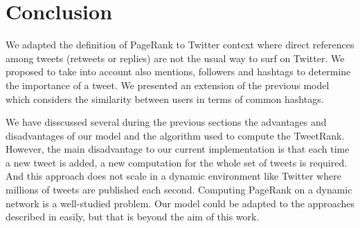 \section{Conclusion}
We adapted the definition of PageRank to Twitter context where direct references among tweets (retweets or replies) are not the usual way to surf on Twitter. We proposed to take into account also mentions, followers and hashtags to determine the importance of a tweet. We presented an extension of the previous model which considers the similarity between users in terms of common hashtags. 

We have disscussed several during the previous sections the advantages and disadvantages of our model and the algorithm used to compute the TweetRank. However, the main disadvantage to our current implementation is that each time a new tweet is added, a new computation for the whole set of tweets is required. And this approach does not scale in a dynamic environment like Twitter where millions of tweets are published each second. Computing PageRank on a dynamic network is a well-studied problem. Our model could be adapted to the approaches described in \cite{Bahmani:2010:FIP:1929861.1929864,Desikan:2005:IPR:1062745.1062885} easily, but that is beyond the aim of this work.